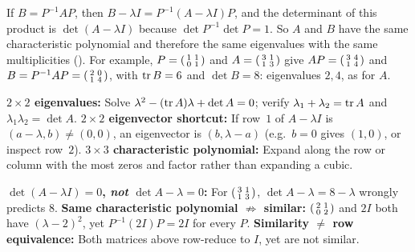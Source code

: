 \documentclass[10pt]{scrartcl}
\begin{document}
 If $B=P^{-1}AP$, then $B-\lambda I=P^{-1}(A-\lambda I)P$, and the determinant of this product is $\det(A-\lambda I)$ because $\det P^{-1}\det P=1$. So $A$ and $B$ have the same characteristic polynomial and therefore the same eigenvalues with the same multiplicities (). For example, $P=\begin{psmallmatrix}1&1\\0&1\end{psmallmatrix}$ and $A=\begin{psmallmatrix}3&1\\1&3\end{psmallmatrix}$ give $AP=\begin{psmallmatrix}3&4\\1&4\end{psmallmatrix}$ and $B=P^{-1}AP=\begin{psmallmatrix}2&0\\1&4\end{psmallmatrix}$, with $\operatorname{tr} B=6$ and $\det B=8$: eigenvalues $2,4$, as for $A$.

\begin{shortcuts}
  \ii \textbf{$2\times 2$ eigenvalues:} Solve $\lambda^2-(\operatorname{tr} A)\lambda+\det A=0$; verify $\lambda_1+\lambda_2=\operatorname{tr} A$ and $\lambda_1\lambda_2=\det A$.
  \ii \textbf{$2\times 2$ eigenvector shortcut:} If row~$1$ of $A-\lambda I$ is $(a-\lambda,b)\ne(0,0)$, an eigenvector is $(b,\lambda-a)$ (e.g.\ $b=0$ gives $(1,0)$, or inspect row~$2$).
  \ii \textbf{$3\times 3$ characteristic polynomial:} Expand along the row or column with the most zeros and factor rather than expanding a cubic.
\end{shortcuts}

\begin{trapbox}
  \ii \textbf{$\det(A-\lambda I)=0$, \emph{not} $\det A-\lambda=0$:} For $\begin{psmallmatrix}3&1\\1&3\end{psmallmatrix}$, $\det A-\lambda=8-\lambda$ wrongly predicts $8$.
  \ii \textbf{Same characteristic polynomial $\not\Rightarrow$ similar:} $\begin{psmallmatrix}2&1\\0&2\end{psmallmatrix}$ and $2I$ both have $(\lambda-2)^2$, yet $P^{-1}(2I)P=2I$ for every $P$.
  \ii \textbf{Similarity $\neq$ row equivalence:} Both matrices above row-reduce to $I$, yet are not similar.
\end{trapbox}
\end{document}
